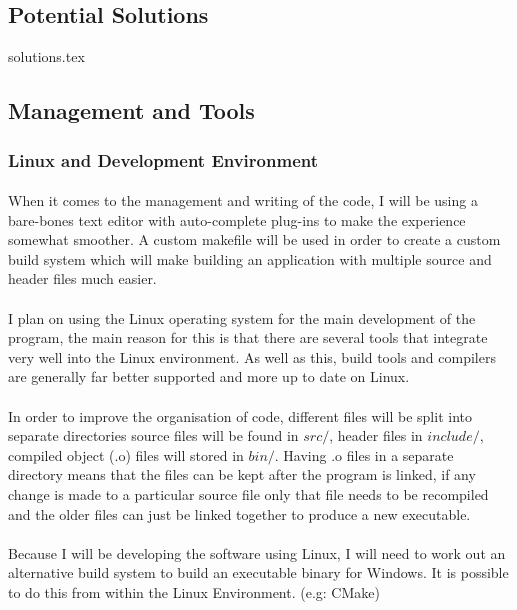 \pagebreak
\subsection{Potential Solutions}
{solutions.tex}

\pagebreak
\subsection{Management and Tools}
\subsubsection{Linux and Development Environment}
\paragraph{}
When it comes to the management and writing of the code, I will be using a bare-bones text editor with auto-complete plug-ins to make the experience somewhat smoother. A custom makefile will be used in order to create a custom build system which will make building an application with multiple source and header files much easier.

\paragraph{}
I plan on using the Linux operating system for the main development of the program, the main reason for this is that there are several tools that integrate very well into the Linux environment. As well as this, build tools and compilers are generally far better supported and more up to date on Linux.

\paragraph{}
In order to improve the organisation of code, different files will be split into separate directories source files will be found in $src/$, header files in $include/$, compiled object (.o) files will stored in $bin/$.
Having .o files in a separate directory means that the files can be kept after the program is linked, if any change is made to a particular source file only that file needs to be recompiled and the older files can just be linked together to produce a new executable.

\paragraph{}
Because I will be developing the software using Linux, I will need to work out an alternative build system to build an executable binary for Windows. It is possible to do this from within the Linux Environment. (e.g: CMake)

